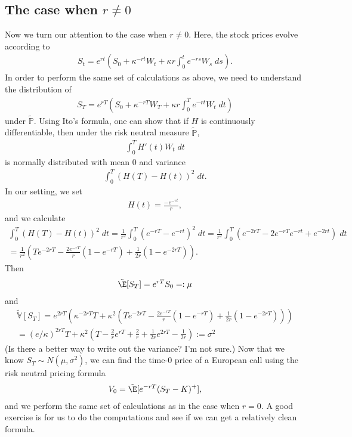 \subsection{The case when $r \neq 0$}
Now we turn our attention to the case when $r \neq 0$. Here, the stock prices evolve according to 
\begin{align}
	 S_t = e^{rt} \left( S_0 + \kappa^{-rt} W_t + \kappa r \int_0^t e^{-rs} W_s \; ds \right).
\end{align}
In order to perform the same set of calculations as above, we need to understand the distribution of 
\begin{align}
	 S_T = e^{rT} \left( S_0 + \kappa^{-rT} W_T + \kappa r \int_0^T e^{-rt} W_t \; dt \right)
\end{align}
under $\tilde{\mathbb{P}}$. Using Ito's formula, one can show that if $H$ is continuously differentiable, then under the risk neutral measure $\tilde{\mathbb{P}}$, 
\begin{align}
	 \int_0^T H'(t) W_t \; dt
\end{align}
is normally distributed with mean 0 and variance 
\begin{align}
	 \int_0^T (H(T) - H(t))^2 \; dt.
\end{align}
In our setting, we set 
\begin{align}
	 H(t) = \frac{-e^{-rt}}{r},
\end{align} 
and we calculate 
\begin{multline}
	 \int_0^T (H(T) - H(t))^2 \; dt = \frac{1}{r^2} \int_0^T (e^{-rT} - e^{-rt})^2 \; dt = \frac{1}{r^2} \int_0^T (e^{-2rT} - 2e^{-rT}e^{-rt} + e^{-2rt}) \; dt \\= \frac{1}{r^2} \left( T e^{-2rT} - \frac{2 e^{-rT}}{r} (1-e^{-rT}) + \frac{1}{2r} (1-e^{-2rT}) \right).
\end{multline}
Then 
\begin{align}
	 \tilde{\E}[S_T] = e^{rT} S_0 =: \mu
\end{align}
and 
\begin{multline}
	 \tilde{\mathbb{V}}[S_T] = e^{2rT} \left(\kappa^{-2rT}T + \kappa^2 \left( T e^{-2rT} - \frac{2 e^{-rT}}{r} (1-e^{-rT}) + \frac{1}{2r} (1-e^{-2rT}) \right)\right) \\
	 = (e/\kappa)^{2rT} T + \kappa^2 \left(T - \frac{2}{r} e^{rT} + \frac{2}{r} + \frac{1}{2r} e^{2rT} - \frac{1}{2r} \right) := \sigma^2
\end{multline}
(Is there a better way to write out the variance? I'm not sure.) Now that we know $S_T \sim N(\mu,\sigma^2)$, we can find the time-0 price of a European call using the risk neutral pricing formula 
\begin{align}
	 V_0 = \tilde{\E}[e^{-rT} (S_T - K)^+],
\end{align}
and we perform the same set of calculations as in the case when $r = 0$. A good exercise is for us to do the computations and see if we can get a relatively clean formula.

